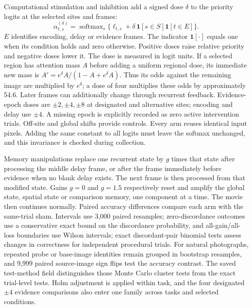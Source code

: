 \documentclass[11pt]{article}
\begin{document}
Computational stimulation and inhibition add a signed dose $\delta$ to the priority logits at the selected sites and frames:
\begin{equation}
 \alpha^{(\delta)}_{t,s}=\operatorname{softmax}_s\{\ell_{t,s}+\delta\,\mathbf 1[s\in S]\mathbf 1[t\in E]\}.
\end{equation}
$E$ identifies encoding, delay or evidence frames. The indicator $\mathbf 1[\cdot]$ equals one when its condition holds and zero otherwise. Positive doses raise relative priority and negative doses lower it. The dose is measured in logit units. If a selected region has attention mass $A$ before adding a uniform regional dose, its immediate new mass is $A'=e^\delta A/(1-A+e^\delta A)$. Thus its odds against the remaining image are multiplied by $e^\delta$; a dose of four multiplies these odds by approximately 54.6. Later frames can additionally change through recurrent feedback. Evidence-epoch doses are $\pm2,\pm4,\pm8$ at designated and alternative sites; encoding and delay use $\pm4$. A missing epoch is explicitly recorded as zero active intervention trials. Off-site and global shifts provide controls. Every arm reuses identical input pixels. Adding the same constant to all logits must leave the softmax unchanged, and this invariance is checked during collection.

Memory manipulations replace one recurrent state by $g$ times that state after processing the middle delay frame, or after the frame immediately before evidence when no blank delay exists. The next frame is then processed from that modified state. Gains $g=0$ and $g=1.5$ respectively reset and amplify the global state, spatial state or comparison memory, one component at a time. The movie then continues normally. Paired accuracy differences compare each arm with the same-trial sham. Intervals use 3,000 paired resamples; zero-discordance outcomes use a conservative exact bound on the discordance probability, and all-gain/all-loss boundaries use Wilson intervals; exact discordant-pair binomial tests assess changes in correctness for independent procedural trials. For natural photographs, repeated probe or base-image identities remain grouped in bootstrap resamples, and 9,999 paired source-image sign flips test the accuracy contrast. The saved test-method field distinguishes those Monte Carlo cluster tests from the exact trial-level tests. Holm adjustment is applied within task, and the four designated $\pm4$ evidence comparisons also enter one family across tasks and selected conditions.
\end{document}
